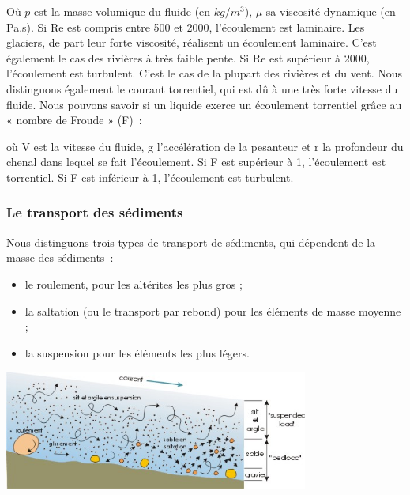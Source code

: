\documentclass[a4paper,11pt]{article}
\begin{document}
\begin{center}
\end{center}
Où $p$ est la masse volumique du fluide (en $kg/m^3$), $\mu$ sa viscosité dynamique (en Pa.s).
\medbreak
Si Re est compris entre 500 et 2000, l’écoulement est laminaire.
Les glaciers, de part leur forte viscosité, réalisent un écoulement laminaire.
C'est également le cas des rivières à très faible pente.
Si Re est supérieur à 2000, l’écoulement est turbulent.
C’est le cas de la plupart des rivières et du vent.
Nous distinguons également le courant torrentiel, qui est dû à une très forte vitesse du fluide.
Nous pouvons savoir si un liquide exerce un écoulement torrentiel grâce au « nombre de Froude » (F)~:
\begin{center}
\end{center}
où V est la vitesse du fluide, g l'accélération de la pesanteur et r la profondeur du chenal dans lequel se fait l'écoulement.
Si F est supérieur à 1, l’écoulement est torrentiel.
Si F est inférieur à 1, l’écoulement est turbulent. \\

\subsubsection{Le transport des sédiments}

Nous distinguons trois types de transport de sédiments, qui dépendent de la masse des sédiments~:
\begin{itemize}
  \item le roulement, pour les altérites les plus gros ;
  \item la saltation (ou le transport par rebond) pour les éléments de masse moyenne ;
  \item la suspension pour les éléments les plus légers.
\end{itemize}

\begin{center}
  \includegraphics[width=10cm]{Images/transport_0.png}
\end{center}
\end{document}
